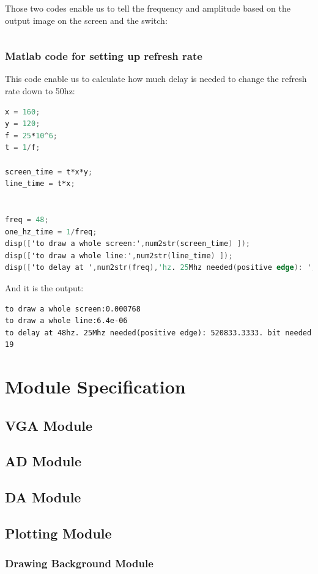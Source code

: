 \documentclass[11pt]{scrartcl}
\begin{document}
Those two codes enable us to tell the frequency and amplitude based on the output image on the screen and the switch:
\begin{lstlisting}[language=Verilog]

\end{lstlisting}

\subsubsection{Matlab code for setting up refresh rate}

This code enable us to calculate how much delay is needed to change the refresh rate down to 50hz:
\begin{lstlisting}[language=Verilog]
x = 160;
y = 120;
f = 25*10^6;
t = 1/f;

screen_time = t*x*y;
line_time = t*x;


freq = 48;
one_hz_time = 1/freq;
disp(['to draw a whole screen:',num2str(screen_time) ]);
disp(['to draw a whole line:',num2str(line_time) ]);
disp(['to delay at ',num2str(freq),'hz. 25Mhz needed(positive edge): ',num2str(one_hz_time/t),'. bit needed ',num2str(ceil(log2(one_hz_time/t)))]);
\end{lstlisting}

And it is the output:
\begin{verbatim}
to draw a whole screen:0.000768
to draw a whole line:6.4e-06
to delay at 48hz. 25Mhz needed(positive edge): 520833.3333. bit needed 19
\end{verbatim}



\section{Module Specification}
\subsection{VGA Module}
\subsection{AD Module}
\subsection{DA Module}
\subsection{Plotting Module}
\subsubsection{Drawing Background Module}
\end{document}
